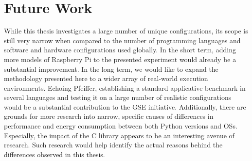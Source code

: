 \section{Future Work}
\label{sec:futurework}
While this thesis investigates a large number of unique configurations, its scope is still very narrow when compared to the number of programming languages and software and hardware configurations used globally. In the short term, adding more models of Raspberry Pi to the presented experiment would already be a substantial improvement. In the long term, we would like to expand the methodology presented here to a wider array of real-world execution environments. Echoing Pfeiffer, establishing a standard applicative benchmark in several languages and testing it on a large number of realistic configurations would be a substantial contribution to the GSE initiative. Additionally, there are grounds for more research into narrow, specific causes of differences in performance and energy consumption between both Python versions and OSs. Especially, the impact of the C library appears to be an interesting avenue of research. Such research would help identify the actual reasons behind the differences observed in this thesis.
